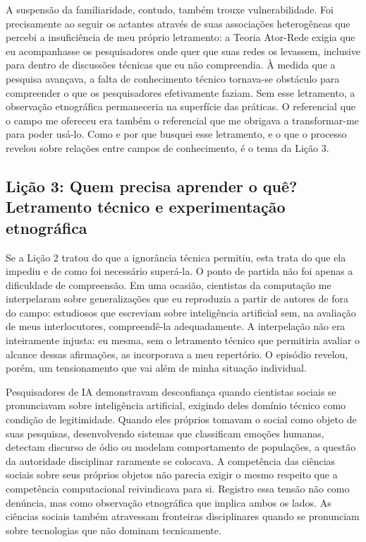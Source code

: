 A suspensão da familiaridade, contudo, também trouxe vulnerabilidade. Foi precisamente ao seguir os actantes através de suas associações heterogêneas que percebi a insuficiência de meu próprio letramento: a Teoria Ator-Rede exigia que eu acompanhasse os pesquisadores onde quer que suas redes os levassem, inclusive para dentro de discussões técnicas que eu não compreendia. À medida que a pesquisa avançava, a falta de conhecimento técnico tornava-se obstáculo para compreender o que os pesquisadores efetivamente faziam. Sem esse letramento, a observação etnográfica permaneceria na superfície das práticas. O referencial que o campo me ofereceu era também o referencial que me obrigava a transformar-me para poder usá-lo. Como e por que busquei esse letramento, e o que o processo revelou sobre relações entre campos de conhecimento, é o tema da Lição 3.

\subsection{Lição 3: Quem precisa aprender o quê? Letramento técnico e experimentação etnográfica}
\label{subsec:licao3}

Se a Lição 2 tratou do que a ignorância técnica permitiu, esta trata do que ela impediu e de como foi necessário superá-la. O ponto de partida não foi apenas a dificuldade de compreensão. Em uma ocasião, cientistas da computação me interpelaram sobre generalizações que eu reproduzia a partir de autores de fora do campo: estudiosos que escreviam sobre inteligência artificial sem, na avaliação de meus interlocutores, compreendê-la adequadamente. A interpelação não era inteiramente injusta: eu mesma, sem o letramento técnico que permitiria avaliar o alcance dessas afirmações, as incorporava a meu repertório. O episódio revelou, porém, um tensionamento que vai além de minha situação individual.

Pesquisadores de IA demonstravam desconfiança quando cientistas sociais se pronunciavam sobre inteligência artificial, exigindo deles domínio técnico como condição de legitimidade. Quando eles próprios tomavam o social como objeto de suas pesquisas, desenvolvendo sistemas que classificam emoções humanas, detectam discurso de ódio ou modelam comportamento de populações, a questão da autoridade disciplinar raramente se colocava. A competência das ciências sociais sobre seus próprios objetos não parecia exigir o mesmo respeito que a competência computacional reivindicava para si. Registro essa tensão não como denúncia, mas como observação etnográfica que implica ambos os lados. As ciências sociais também atravessam fronteiras disciplinares quando se pronunciam sobre tecnologias que não dominam tecnicamente.

